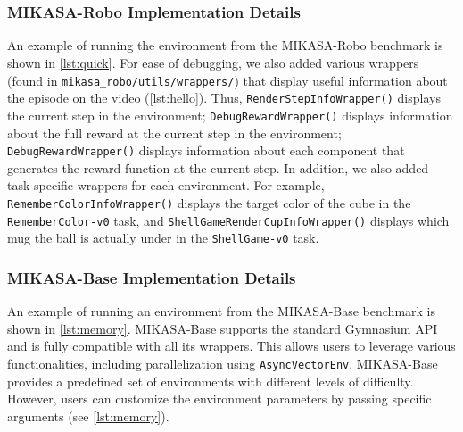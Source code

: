 \newpage

\part{\vspace{-30pt}}
\parttoc

\newpage
\section{MIKASA-Robo Implementation Details}
\label{app:maniskill-memory-imp-details}

An example of running the environment from the MIKASA-Robo benchmark is shown in \autoref{lst:quick}. For ease of debugging, we also added various wrappers (found in \texttt{mikasa\_robo/utils/wrappers/}) that display useful information about the episode on the video (\autoref{lst:hello}). Thus, \texttt{RenderStepInfoWrapper()} displays the current step in the environment; \texttt{DebugRewardWrapper()} displays information about the full reward at the current step in the environment; \texttt{DebugRewardWrapper()} displays information about each component that generates the reward function at the current step. In addition, we also added task-specific wrappers for each environment. For example, \texttt{RememberColorInfoWrapper()} displays the target color of the cube in the \texttt{RememberColor-v0} task, and \texttt{ShellGameRenderCupInfoWrapper()} displays which mug the ball is actually under in the \texttt{ShellGame-v0} task.




\newpage
\section{MIKASA-Base Implementation Details}
\label{app:mikasa-code}

An example of running an environment from the MIKASA-Base benchmark is shown in \autoref{lst:memory}. MIKASA-Base supports the standard Gymnasium API and is fully compatible with all its wrappers. This allows users to leverage various functionalities, including parallelization using \texttt{AsyncVectorEnv}. MIKASA-Base provides a predefined set of environments with different levels of difficulty. However, users can customize the environment parameters by passing specific arguments (see \autoref{lst:memory}). 



